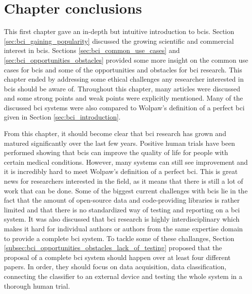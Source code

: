 
\section{Chapter conclusions}
\label{sec:bci_concolusion_and_proposing_ours}




This first chapter gave an in-depth but intuitive introduction to \glspl{bci}.
Section \ref{sec:bci_gaining_popularity} discussed the growing scientific and commercial interest in \glspl{bci}.
Sections \ref{sec:bci_common_use_cases} and \ref{sec:bci_opportunities_obstacles} provided some more insight on the common use cases for \glspl{bci} and some of the opportunities and obstacles for \gls{bci} research.
This chapter ended by addressing some ethical challenges any researcher interested in \glspl{bci} should be aware of.
Throughout this chapter, many articles were discussed and some strong points and weak points were explicitly mentioned.
Many of the discussed \gls{bci} systems were also compared to Wolpaw's definition of a perfect \gls{bci} given in Section \ref{sec:bci_introduction}.

From this chapter, it should become clear that \gls{bci} research has grown and matured significantly over the last few years.
Positive human trials have been performed showing that \glspl{bci} can improve the quality of life for people with certain medical conditions.
However, many systems can still see improvement and it is incredibly hard to meet Wolpaw's definition of a perfect \gls{bci}.
This is great news for researchers interested in the field, as it means that there is still a lot of work that can be done.
Some of the biggest current challenges with \glspl{bci} lie in the fact that the amount of open-source data and code-providing libraries is rather limited and that there is no standardized way of testing and reporting on a \gls{bci} system.
It was also discussed that \gls{bci} research is highly interdisciplinary which makes it hard for individual authors or authors from the same expertise domain to provide a complete \gls{bci} system.
To tackle some of these challanges, Section \ref{subsec:bci_opportunities_obstacles_lack_of_testing} proposed that the proposal of a complete \gls{bci} system should happen over at least four different papers.
In order, they should focus on data acquisition, data classification, connecting the classifier to an external device and testing the whole system in a thorough human trial.


